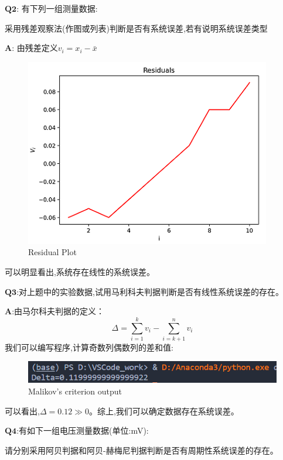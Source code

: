 \documentclass[homework]{IEEEtran}
\begin{document}
\begin{CJK}{UTF8}{gkai}
$\mathbf{Q2}$: 有下列一组测量数据:  \par
    [10.06,10.07,10.06,10.08,10.10,        \par
    10.12,10.14,10.18,10.18,10.21]         \par
采用残差观察法(作图或列表)判断是否有系统误差,若有说明系统误差类型 \par
$\mathbf{A}$: 由残差定义$v_i = x_i - \bar{x}$
\begin{figure}[htb]
\centerline{\includegraphics{Images/fig2.jpg}}
\caption{Residual Plot}
\label{fig2}
\end{figure}
可以明显看出,系统存在线性的系统误差。 \par
$\mathbf{Q3}$:对上题中的实验数据,试用马利科夫判据判断是否有线性系统误差的存在。\par
$\mathbf{A}$:由马尔科夫判据的定义：
$$
\Delta=\sum_{i=1}^{k} v_{i}-\sum_{i=k+1}^{n} v_{i}
$$
我们可以编写程序,计算奇数列偶数列的差和值: \par
\begin{figure}[htb]
\centerline{\includegraphics{Images/fig3.png}}
\caption{Malikov's criterion output}
\label{fig3}
\end{figure}
可以看出,$\Delta = 0.12 \gg 0$。综上,我们可以确定数据存在系统误差。 \par
$\mathbf{Q4}$:有如下一组电压测量数据(单位:mV):\par
    [50.74,50.76,50.82,50.85,50.83,      \par
    50.74,50.75,50.81,50.85,50.85]       \par
请分别采用阿贝判据和阿贝-赫梅尼判据判断是否有周期性系统误差的存在。\par

\end{CJK}
\end{document}
